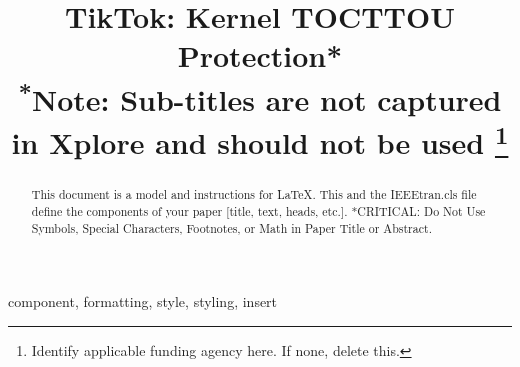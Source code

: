 \documentclass[conference]{IEEEtran}
\begin{document}
\title{TikTok: Kernel TOCTTOU Protection*\\
{\footnotesize \textsuperscript{*}Note: Sub-titles are not captured in Xplore and
should not be used}
\thanks{Identify applicable funding agency here. If none, delete this.}
}

\author{
\and
{}
}

\maketitle

\begin{abstract}
This document is a model and instructions for \LaTeX.
This and the IEEEtran.cls file define the components of your paper [title, text, heads, etc.]. *CRITICAL: Do Not Use Symbols, Special Characters, Footnotes, 
or Math in Paper Title or Abstract.
\end{abstract}

\begin{IEEEkeywords}
component, formatting, style, styling, insert
\end{IEEEkeywords}
\end{document}
